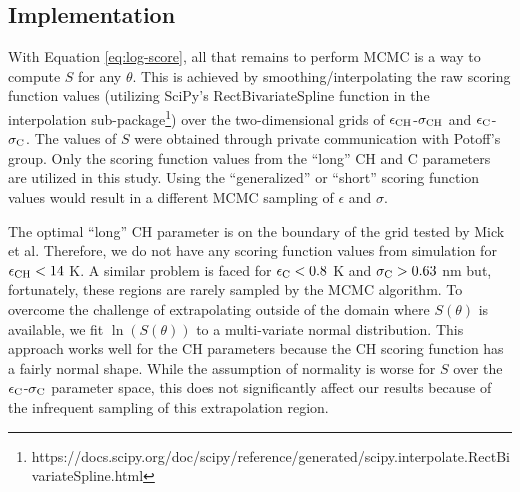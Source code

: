 \documentclass[preprint,review,11pt]{elsarticle}
\begin{document}
    \subsection{Implementation}

    With Equation \ref{eq:log-score}, all that remains to perform MCMC is a way to compute $S$ for any $\theta$. This is achieved by smoothing/interpolating the raw scoring function values (utilizing SciPy's RectBivariateSpline function in the interpolation sub-package\footnote{https://docs.scipy.org/doc/scipy/reference/generated/scipy.interpolate.RectBivariateSpline.html}) over the two-dimensional grids of $\epsilon_{\rm CH}$-$\sigma_{\rm CH}$ and $\epsilon_{\rm C}$-$\sigma_{\rm C}$. The values of $S$ were obtained through private communication with Potoff's group. Only the scoring function values from the ``long'' CH and C parameters are utilized in this study. Using the ``generalized'' or ``short'' scoring function values would result in a different MCMC sampling of $\epsilon$ and $\sigma$.
	
	The optimal ``long'' CH parameter is on the boundary of the grid tested by Mick et al. Therefore, we do not have any scoring function values from simulation for $\epsilon_{\rm CH} < 14$ K. A similar problem is faced for $\epsilon_{\rm C} < 0.8$ K and $\sigma_{\rm C} > 0.63$ nm but, fortunately, these regions are rarely sampled by the MCMC algorithm. To overcome the challenge of extrapolating outside of the domain where $S(\theta)$ is available, we fit $\ln(S(\theta))$ to a multi-variate normal distribution. This approach works well for the CH parameters because the CH scoring function has a fairly normal shape. While the assumption of normality is worse for $S$ over the $\epsilon_{\rm C}$-$\sigma_{\rm C}$ parameter space, this does not significantly affect our results because of the infrequent sampling of this extrapolation region.   
\end{document}
